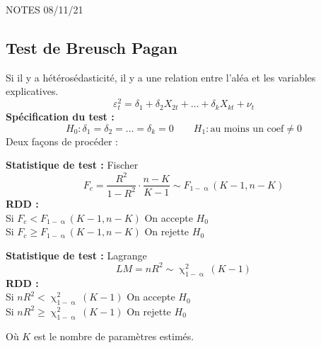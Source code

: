 \documentclass{article}
\begin{document}
NOTES 08/11/21 \\
\subsection{Test de Breusch Pagan}
Si il y a hétérosédasticité, il y a une relation entre l'aléa et les variables explicatives. \\
\begin{equation*}
		\varepsilon_{t}^2 = \delta_{1} + \delta_{2} X_{2t} + \ldots + \delta_{k} X_{kt} + \nu_{t}
\end{equation*}
\textbf{Spécification du test :}
\begin{equation*}
	H_0 : \delta_1 = \delta_2 = \ldots = \delta_k = 0 \qquad H_1 : \text{au moins un coef} \neq 0 
\end{equation*}
Deux façons de procéder :
\begin{multicols}{2}
\textbf{Statistique de test :} Fischer
\begin{equation*}
		F_{c} = \frac{R^2}{1-R^2} \cdot \frac{n-K}{K-1} \sim F_{1-\upalpha}(K-1, n-K)
\end{equation*}
\textbf{RDD :} \\
Si $F_c < F_{1-\upalpha}(K-1, n-K)$ On accepte $H_0$ \\ 
Si $F_c \geq F_{1-\upalpha}(K-1, n-K)$ On rejette $H_0$ \\
\columnbreak

\textbf{Statistique de test :} Lagrange
\begin{equation*}
		LM = n R^2 \sim \upchi^2_{1-\upalpha} (K-1)
\end{equation*}
\textbf{RDD : } \\
Si $nR^2 < \upchi^2_{1-\upalpha} (K-1)$ On accepte $H_0$\\
Si $nR^2 \geq \upchi^2_{1-\upalpha} (K-1)$ On rejette $H_0$ \\ 
\end{multicols}
Où $K$ est le nombre de paramètres estimés.
\end{document}

